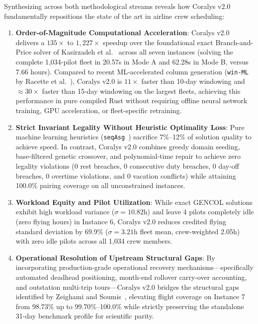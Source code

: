 \documentclass[journal]{IEEEtran}
\begin{document}
Synthesizing across both methodological streams reveals how Coralys v2.0 fundamentally repositions the state of the art in airline crew scheduling:
\begin{enumerate}
    \item \textbf{Order-of-Magnitude Computational Acceleration}: Coralys v2.0 delivers a $135\times$ to $1,227\times$ speedup over the foundational exact Branch-and-Price solver of Kasirzadeh et al.~\cite{kasirzadeh2017} across all seven instances (solving the complete 1,034-pilot fleet in 20.57s in Mode A and 62.28s in Mode B, versus 7.66 hours). Compared to recent ML-accelerated column generation (\texttt{win-ML} by Racette et al.~\cite{racette2025}), Coralys v2.0 is $11\times$ faster than 10-day windowing and $\approx 30\times$ faster than 15-day windowing on the largest fleets, achieving this performance in pure compiled Rust without requiring offline neural network training, GPU acceleration, or fleet-specific retraining.
    \item \textbf{Strict Invariant Legality Without Heuristic Optimality Loss}: Pure machine learning heuristics (\texttt{seqAsg}~\cite{racette2024}) sacrifice 7\%--12\% of solution quality to achieve speed. In contrast, Coralys v2.0 combines greedy domain seeding, base-filtered genetic crossover, and polynomial-time repair to achieve zero legality violations (0 rest breaches, 0 consecutive duty breaches, 0 day-off breaches, 0 overtime violations, and 0 vacation conflicts) while attaining 100.0\% pairing coverage on all unconstrained instances.
    \item \textbf{Workload Equity and Pilot Utilization}: While exact GENCOL solutions exhibit high workload variance ($\sigma = 10.82$h) and leave 4 pilots completely idle (zero flying hours) in Instance 6, Coralys v2.0 reduces credited flying standard deviation by 69.9\% ($\sigma = 3.21$h fleet mean, crew-weighted 2.05h) with zero idle pilots across all 1,034 crew members.
    \item \textbf{Operational Resolution of Upstream Structural Gaps}: By incorporating production-grade operational recovery mechanisms---specifically automated deadhead positioning, month-end rollover carry-over accounting, and outstation multi-trip tours---Coralys v2.0 bridges the structural gaps identified by Zeighami and Soumis~\cite{zeighami2019}, elevating flight coverage on Instance 7 from 98.73\% up to 99.70\%--100.0\% while strictly preserving the standalone 31-day benchmark profile for scientific parity.
\end{enumerate}
\end{document}
